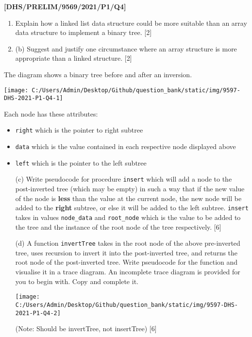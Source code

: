 \item \textbf{{[}DHS/PRELIM/9569/2021/P1/Q4{]} }
\begin{enumerate}
\item Explain how a linked list data structure could be more suitable than
an array data structure to implement a binary tree. \hfill{}{[}2{]}
\item (b) Suggest and justify one circumstance where an array structure
is more appropriate than a linked structure. \hfill{}{[}2{]}
\end{enumerate}
The diagram shows a binary tree before and after an inversion. 
\begin{center}
\texttt{[image: C:/Users/Admin/Desktop/Github/question\_bank/static/img/9597-DHS-2021-P1-Q4-1]}
\par\end{center}

Each node has these attributes: 
\begin{itemize}
\item \texttt{right} which is the pointer to right subtree 
\item \texttt{data} which is the value contained in each respective node
displayed above 
\item \texttt{left} which is the pointer to the left subtree
\end{itemize}
\begin{enumerate}
\item[(c)]  Write pseudocode for procedure \texttt{insert} which will add a
node to the post-inverted tree (which may be empty) in such a way
that if the new value of the node is \textbf{less} than the value
at the current node, the new node will be added to the \textbf{right}
subtree, or else it will be added to the left subtree. \texttt{insert}
takes in values \texttt{node\_data} and \texttt{root\_node} which
is the value to be added to the tree and the instance of the root
node of the tree respectively. \hfill{}{[}6{]}
\item[(d) ] A function \texttt{invertTree} takes in the root node of the above
pre-inverted tree, uses recursion to invert it into the post-inverted
tree, and returns the root node of the post-inverted tree. Write pseudocode
for the function and visualise it in a trace diagram. An incomplete
trace diagram is provided for you to begin with. Copy and complete
it. 
\noindent \begin{center}
\texttt{[image: C:/Users/Admin/Desktop/Github/question\_bank/static/img/9597-DHS-2021-P1-Q4-2]}
\par\end{center}

(Note: Should be invertTree, not insertTree) \hfill{}{[}6{]}
\end{enumerate}